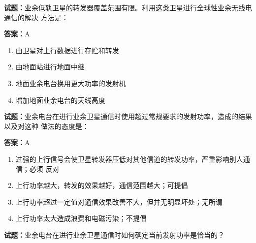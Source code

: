 \documentclass{ctexbook}
\begin{document}




\vspace{1em}

\textbf{试题：}业余低轨卫星的转发器覆盖范围有限。利用这类卫星进行全球性业余无线电通信的解决
方法是： 

\textbf{答案：}A 


\begin{enumerate}[leftmargin=3em]
  \item 由卫星对上行数据进行存贮和转发 

  \item 由地面站进行地面中继 

  \item 地面业余电台换用更大功率的发射机 

  \item 增加地面业余电台的天线高度 

\end{enumerate}





\vspace{1em}

\textbf{试题：}业余电台在进行业余卫星通信时使用超过常规要求的发射功率，造成的结果以及对这种
做法的态度是： 

\textbf{答案：}A 

\begin{enumerate}[leftmargin=3em]
  \item 过强的上行信号会使卫星转发器压低对其他信道的转发功率，严重影响别人通信；必须
反对 

  \item 上行功率越大，转发的效果越好，通信范围越大；可提倡 

  \item 上行功率超过一定值对通信效果改善不大，但并无明显坏处；无所谓 

  \item 上行功率太大造成浪费和电磁污染；不提倡 

\end{enumerate}





\vspace{1em}

\textbf{试题：}业余电台在进行业余卫星通信时如何确定当前发射功率是恰当的？ 
\end{document}
